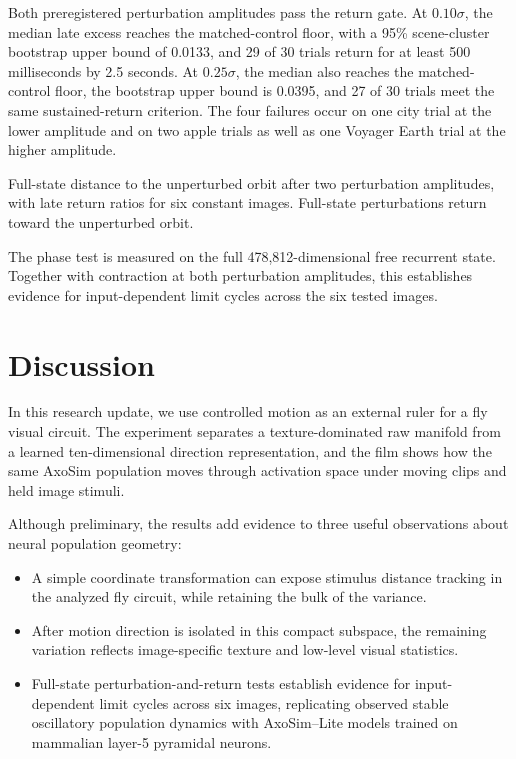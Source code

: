 \documentclass[11pt]{article}
\begin{document}
Both preregistered perturbation amplitudes pass the return gate. At $0.10\sigma$, the median late excess reaches the matched-control floor, with a 95\% scene-cluster bootstrap upper bound of 0.0133, and 29 of 30 trials return for at least 500 milliseconds by 2.5 seconds. At $0.25\sigma$, the median also reaches the matched-control floor, the bootstrap upper bound is 0.0395, and 27 of 30 trials meet the same sustained-return criterion. The four failures occur on one city trial at the lower amplitude and on two apple trials as well as one Voyager Earth trial at the higher amplitude.

  {Full-state distance to the unperturbed orbit after two perturbation amplitudes, with late return ratios for six constant images.}
  {Full-state perturbations return toward the unperturbed orbit.}

The phase test is measured on the full 478,812-dimensional free recurrent state. Together with contraction at both perturbation amplitudes, this establishes evidence for input-dependent limit cycles across the six tested images.

\section{Discussion}

In this research update, we use controlled motion as an external ruler for a fly visual circuit. The experiment separates a texture-dominated raw manifold from a learned ten-dimensional direction representation, and the film shows how the same AxoSim population moves through activation space under moving clips and held image stimuli.

Although preliminary, the results add evidence to three useful observations about neural population geometry:

\begin{itemize}
\tightlist
\item A simple coordinate transformation can expose stimulus distance tracking in the analyzed fly circuit, while retaining the bulk of the variance.
\item After motion direction is isolated in this compact subspace, the remaining variation reflects image-specific texture and low-level visual statistics.
\item Full-state perturbation-and-return tests establish evidence for input-dependent limit cycles across six images, replicating observed stable oscillatory population dynamics with AxoSim--Lite models trained on mammalian layer-5 pyramidal neurons.
\end{itemize}
\end{document}
